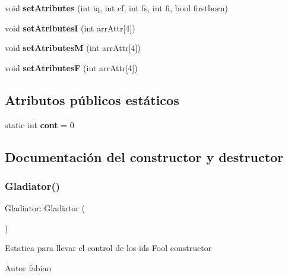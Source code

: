 \begin{DoxyCompactItemize}
void {\bfseries set\+Atributes} (int iq, int cf, int fs, int fi, bool firstborn)
\item 
\mbox{\label{classGladiator_a1c9043398666df318df10a8954c68dfd}} 
void {\bfseries set\+AtributesI} (int arr\+Attr\mbox{[}4\mbox{]})
\item 
\mbox{\label{classGladiator_a8009e23ee530cc2a8a8dc2615ebd2eb2}} 
void {\bfseries set\+AtributesM} (int arr\+Attr\mbox{[}4\mbox{]})
\item 
\mbox{\label{classGladiator_acc14c7640e7d596071f5f98488361438}} 
void {\bfseries set\+AtributesF} (int arr\+Attr\mbox{[}4\mbox{]})
\end{DoxyCompactItemize}
\subsection*{Atributos públicos estáticos}
\begin{DoxyCompactItemize}
\item 
\mbox{\label{classGladiator_a5d22cb125898f75637b1294441116263}} 
static int {\bfseries cont} = 0
\end{DoxyCompactItemize}


\subsection{Documentación del constructor y destructor}
\mbox{\label{classGladiator_aa795391070e17c3b16488c3c1f124aa2}} 
\subsubsection{\texorpdfstring{Gladiator()}{Gladiator()}\hspace{0.1cm}{\footnotesize\ttfamily [1/2]}}
{\footnotesize\ttfamily Gladiator\+::\+Gladiator (\begin{DoxyParamCaption}{ }\end{DoxyParamCaption})}

Estatica para llevar el control de los ids Fool constructor \begin{DoxyAuthor}{Autor}
fabian 
\end{DoxyAuthor}
\mbox{\label{classGladiator_a12982a76511fc661e3124cdb8a1dbe38}} 
